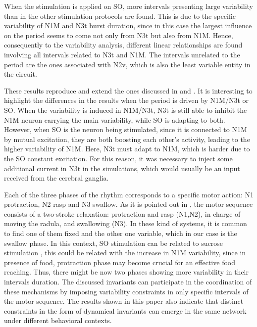 When the stimulation is applied on SO, more intervals presenting large variability than in the other stimulation protocols are found. This is due to the specific variability of N1M and N3t burst duration, since in this case the largest influence on the period seems to come not only from N3t but also from N1M. Hence, consequently to the variability analysis, different linear relationships are found involving all intervals related to N3t and N1M. The intervals unrelated to the period are the ones associated with N2v, which is also the least variable entity in the circuit. 


These results reproduce and extend the ones discussed in \cite{vavoulis_dynamic_2007} and \cite{elliott_temporal_1991}. It is interesting to highlight the differences in the results when the period is driven by N1M/N3t or SO. When the variability is induced in N1M/N3t, N3t is still able to inhibit the N1M neuron carrying the main variability, while SO is adapting to both. However, when SO is the neuron being stimulated, since it is connected to N1M by mutual excitation, they are both boosting each other's activity, leading to the higher variability of N1M. Here, N3t must adapt to N1M, which is harder due to the SO constant excitation. For this reason, it was necessary to inject some additional current in N3t in the simulations, which would usually be an input received from the cerebral ganglia. 

Each of the three phases of the rhythm corresponds to a specific motor action: N1 protraction, N2 rasp and N3 swallow. As it is pointed out in \cite{elliott_temporal_1991}, the motor sequence consists of a two-stroke relaxation: protraction and rasp (N1,N2), in charge of moving the radula, and swallowing (N3). In these kind of systems, it is common to find one of them fixed and the other one variable, which in our case is the swallow phase. In this context, SO stimulation can be related to sucrose stimulation \cite{benjamin_distributed_2012,kemenes_analysis_1994},
this could be related with the increase in N1M variability, since in presence of food, protraction phase may become crucial for an effective food reaching. Thus, there might be now two phases showing more variability in their intervals duration. The discussed invariants can participate in the coordination of these mechanisms by imposing  variability constraints in only specific intervals of the motor sequence. The results shown in this paper also indicate that distinct constraints in the form of dynamical invariants can emerge in the same network under different behavioral contexts.



